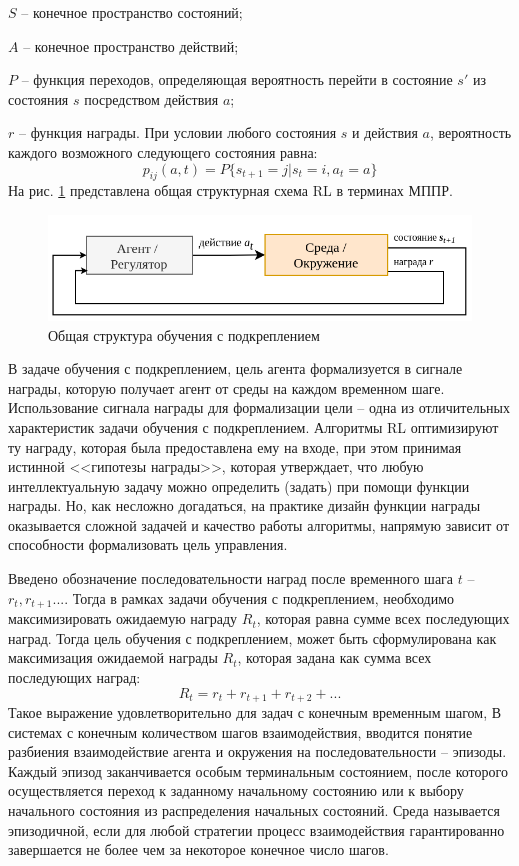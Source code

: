 $S$ – конечное пространство состояний;

$A$ – конечное пространство действий;

$P$ – функция переходов, определяющая вероятность перейти в состояние $s'$ из состояния $s$ посредством действия $a$;

$r$  – функция награды.
При условии любого состояния $s$ и действия $a$, вероятность каждого возможного следующего состояния равна:
\begin{equation*}
p_{ij}(a, t) = P\{s_{t+1}=j|s_t=i, a_t=a\}
\end{equation*}
На рис. \ref{fig:intro} представлена общая структурная схема RL в терминах МППР.
\begin{figure}[ht!] 
	\center
	\includegraphics [scale=0.5] {my_folder/figure/schema/intro.png}
	\caption{Общая структура обучения с подкреплением} 
	\label{fig:intro}  
\end{figure}

В задаче обучения с подкреплением, цель агента формализуется в сигнале награды, которую получает агент от среды на каждом временном шаге. Использование сигнала награды для формализации цели -- одна из отличительных характеристик задачи обучения с подкреплением. Алгоритмы RL оптимизируют ту награду, которая была предоставлена ему на входе, при этом принимая истинной  <<гипотезы награды>>, которая утверждает, что любую интеллектуальную задачу можно определить (задать) при помощи функции награды. Но, как несложно догадаться, на практике дизайн функции награды оказывается сложной задачей и качество работы алгоритмы, напрямую зависит от способности формализовать цель управления.

Введено обозначение последовательности наград после временного шага $t$ -- $r_t, r_{t+1} ...$. Тогда в рамках задачи обучения с подкреплением, необходимо максимизировать ожидаемую награду $R_t$, которая равна сумме всех последующих наград. Тогда цель обучения с подкреплением, может быть сформулирована как максимизация ожидаемой награды $R_t$, которая задана как сумма всех последующих наград:
%
\begin{equation*}
R_t = r_t + r_{t+1} +  r_{t+2} + ... 
\end{equation*}
%
Такое выражение удовлетворительно для задач с конечным временным шагом,
В системах с конечным количеством шагов взаимодействия, вводится понятие разбиения взаимодействие агента и окружения на последовательности -- эпизоды. Каждый эпизод заканчивается особым терминальным состоянием, после которого осуществляется переход к заданному начальному состоянию или к выбору начального состояния из распределения начальных состояний. Среда называется эпизодичной, если для любой стратегии процесс взаимодействия гарантированно завершается не более чем за некоторое конечное число шагов.

